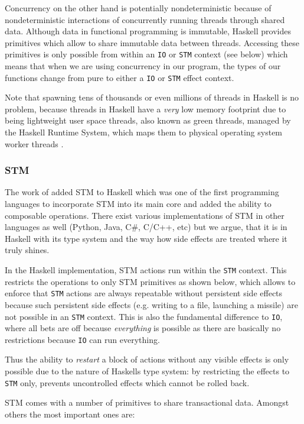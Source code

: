 Concurrency on the other hand is potentially nondeterministic because of nondeterministic interactions of concurrently running threads through shared data. Although data in functional programming is immutable, Haskell provides primitives which allow to share immutable data between threads. Accessing these primitives is only possible from within an \texttt{IO} or \texttt{STM} context (see below) which means that when we are using concurrency in our program, the types of our functions change from pure to either a \texttt{IO} or \texttt{STM} effect context.

Note that spawning tens of thousands or even millions of threads in Haskell is no problem, because threads in Haskell have a \textit{very} low memory footprint due to being lightweight user space threads, also known as green threads, managed by the Haskell Runtime System, which maps them to physical operating system worker threads \cite{marlow_runtime_2009}.

\subsubsection{STM}
The work of \cite{harris_composable_2005, harris_transactional_2006} added STM to Haskell which was one of the first programming languages to incorporate STM into its main core and added the ability to composable operations. There exist various implementations of STM in other languages as well (Python, Java, C\#, C/C++, etc) but we argue, that it is in Haskell with its type system and the way how side effects are treated where it truly shines.

In the Haskell implementation, STM actions run within the \texttt{STM} context. This restricts the operations to only STM primitives as shown below, which allows to enforce that \texttt{STM} actions are always repeatable without persistent side effects because such persistent side effects (e.g. writing to a file, launching a missile) are not possible in an \texttt{STM} context. This is also the fundamental difference to  \texttt{IO}, where all bets are off because \textit{everything} is possible as there are basically no restrictions because \texttt{IO} can run everything.

Thus the ability to \textit{restart} a block of actions without any visible effects is only possible due to the nature of Haskells type system: by restricting the effects to \texttt{STM} only, prevents uncontrolled effects which cannot be rolled back.

STM comes with a number of primitives to share transactional data. Amongst others the most important ones are:

